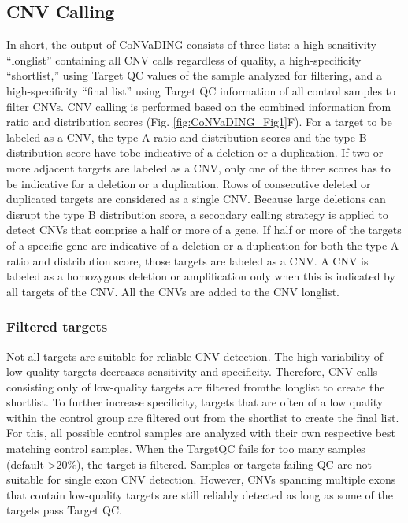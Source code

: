\subsection{CNV Calling}
In short, the output of CoNVaDING consists of three lists: a high-sensitivity “longlist” containing all CNV calls regardless of quality, a high-specificity “shortlist,” using Target QC values of the sample analyzed for filtering, and a high-specificity “final list” using Target QC information of all control samples to filter CNVs. 
CNV calling is performed based on the combined information from ratio and distribution scores (Fig. \ref{fig:CoNVaDING_Fig1}F).
For a target to be labeled as a CNV, the type A ratio and distribution scores and the type B distribution score have tobe indicative of a deletion or a duplication. 
If two or more adjacent targets are labeled as a CNV, only one of the three scores has to be indicative for a deletion or a duplication. 
Rows of consecutive deleted or duplicated targets are considered as a single CNV. Because large deletions can disrupt the type B distribution score, a secondary calling strategy is applied to detect CNVs that comprise a half or more of a gene. 
If half or more of the targets of a specific gene are indicative of a deletion or a duplication for both the type A ratio and distribution score, those targets are labeled as a CNV. 
A CNV is labeled as a homozygous deletion or amplification only when this is indicated by all targets of the CNV. 
All the CNVs are added to the CNV longlist.

\subsubsection{Filtered targets}
Not all targets are suitable for reliable CNV detection. 
The high variability of low-quality targets decreases sensitivity and specificity. 
Therefore, CNV calls consisting only of low-quality targets are filtered fromthe longlist to create the shortlist. 
To further increase specificity, targets that are often of a low quality within the control group are filtered out from the shortlist to create the final list. 
For this, all possible control samples are analyzed with their own respective best matching control samples. When the TargetQC fails for too many samples (default \textgreater20\%), the target is filtered. 
Samples or targets failing QC are not suitable for single exon CNV detection. 
However, CNVs spanning multiple exons that contain low-quality targets are still reliably detected as long as some of the targets pass Target QC.

